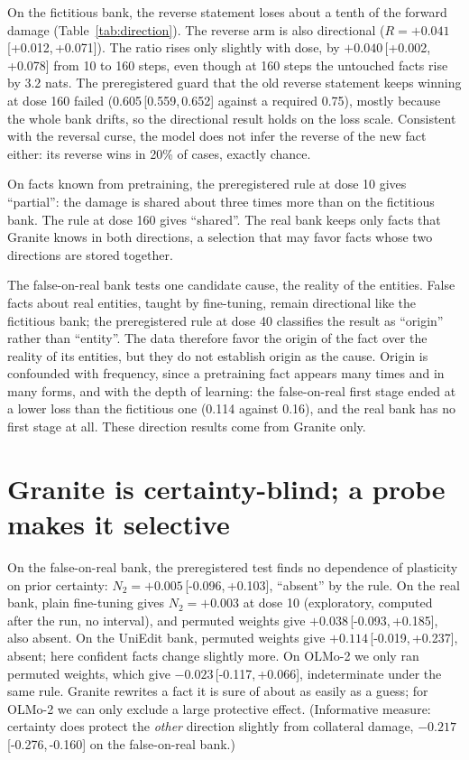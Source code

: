 \documentclass[11pt]{article}
\newcommand{\NTwo}{\ensuremath{N_2}}
\newcommand{\ci}[2]{\,[#1,\,#2]}
\begin{document}
On the fictitious bank, the reverse statement loses about a tenth of the forward damage (Table~\ref{tab:direction}).
The reverse arm is also directional ($R=+0.041$\ci{+0.012}{+0.071}).
The ratio rises only slightly with dose, by $+0.040$\ci{+0.002}{+0.078} from 10 to 160 steps, even though at 160 steps the untouched facts rise by 3.2 nats.
The preregistered guard that the old reverse statement keeps winning at dose 160 failed (0.605\ci{0.559}{0.652} against a required 0.75), mostly because the whole bank drifts, so the directional result holds on the loss scale.
Consistent with the reversal curse, the model does not infer the reverse of the new fact either: its reverse wins in 20\% of cases, exactly chance.

On facts known from pretraining, the preregistered rule at dose 10 gives ``partial'': the damage is shared about three times more than on the fictitious bank.
The rule at dose 160 gives ``shared''.
The real bank keeps only facts that Granite knows in both directions, a selection that may favor facts whose two directions are stored together.

The false-on-real bank tests one candidate cause, the reality of the entities.
False facts about real entities, taught by fine-tuning, remain directional like the fictitious bank; the preregistered rule at dose 40 classifies the result as ``origin'' rather than ``entity''.
The data therefore favor the origin of the fact over the reality of its entities, but they do not establish origin as the cause.
Origin is confounded with frequency, since a pretraining fact appears many times and in many forms, and with the depth of learning: the false-on-real first stage ended at a lower loss than the fictitious one (0.114 against 0.16), and the real bank has no first stage at all.
These direction results come from Granite only.

\section{Granite is certainty-blind; a probe makes it selective}
\label{sec:certainty}

On the false-on-real bank, the preregistered test finds no dependence of plasticity on prior certainty: $\NTwo=+0.005$\ci{-0.096}{+0.103}, ``absent'' by the rule.
On the real bank, plain fine-tuning gives $\NTwo=+0.003$ at dose 10 (exploratory, computed after the run, no interval), and permuted weights give $+0.038$\ci{-0.093}{+0.185}, also absent.
On the UniEdit bank, permuted weights give $+0.114$\ci{-0.019}{+0.237}, absent; here confident facts change slightly more.
On OLMo-2 we only ran permuted weights, which give $-0.023$\ci{-0.117}{+0.066}, indeterminate under the same rule.
Granite rewrites a fact it is sure of about as easily as a guess; for OLMo-2 we can only exclude a large protective effect.
(Informative measure: certainty does protect the \emph{other} direction slightly from collateral damage, $-0.217$\ci{-0.276}{-0.160} on the false-on-real bank.)
\end{document}
